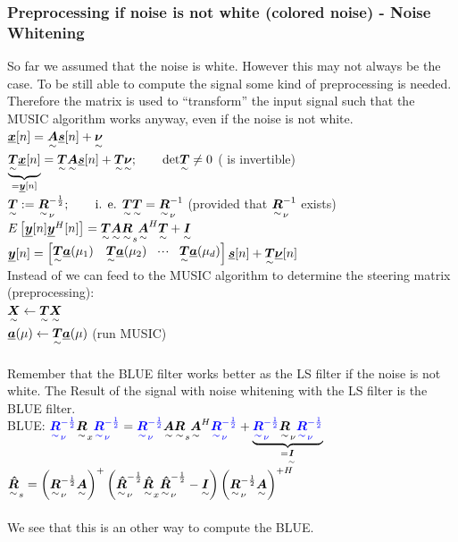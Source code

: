 \subsubsection{Preprocessing if noise is not white (colored noise) - Noise Whitening}
So far we assumed that the noise is white. However this may not always be the case. To be still able to compute the signal some kind of preprocessing is needed. Therefore the matrix  is used to ``transform'' the input signal such that the MUSIC algorithm works anyway, even if the noise is not white.\\
$\vec{x}[n]=\ma{A}\vec{s}[n]+\ma{\nu}$\\
$\underbrace{\ma{T}\vec{x}[n]}_{=\vec{y}[n]}=\ma{T}\ma{A}\vec{s}[n]+\ma{T}\ma{\nu};\qquad \text{det}\ma{T}\neq 0$ ( is invertible)\\
$\ma{T}:=\ma{R}_\nu^{-\frac{1}{2}};\qquad \text{i. e. } \ma{T}\ma{T}=\ma{R}_\nu^{-1}$ (provided that $\ma{R}_\nu^{-1}$ exists)\\
$E\left[\vec{y}[n]\vec{y}^H[n]\right]=\ma{T}\ma{A}\ma{R}_s\ma{A}^H\ma{T}+\ma{I}$\\
$\vec{y}[n]=\mat{\ma{T}\vec{a}(\mu_1)&\ma{T}\vec{a}(\mu_2)&\shdots&\ma{T}\vec{a}(\mu_d)}\vec{s}[n]+\ma{T}\vec{\nu}[n]$\\
Instead of  we can feed  to the MUSIC algorithm to determine the steering matrix (preprocessing):\\
$\ma{X}\leftarrow\ma{T}\ma{X}$\\
$\vec{a}(\mu)\leftarrow\ma{T}\vec{a}(\mu)$ (run MUSIC)\\ \\
\Ra Remember that the BLUE filter works better as the LS filter if the noise is not white. The Result of the signal with noise whitening with the LS filter is the BLUE filter. \\

BLUE: $\textcolor[rgb]{0,0,1}{\ma{R}_\nu^{-\frac{1}{2}}}\ma{R}_x\textcolor[rgb]{0,0,1}{\ma{R}_\nu^{-\frac{1}{2}}}=\textcolor[rgb]{0,0,1}{\ma{R}_\nu^{-\frac{1}{2}}}\ma{A}\ma{R}_s\ma{A}^H\textcolor[rgb]{0,0,1}{\ma{R}_\nu^{-\frac{1}{2}}}+\underbrace{\textcolor[rgb]{0,0,1}{\ma{R}_\nu^{-\frac{1}{2}}}\ma{R}_\nu\textcolor[rgb]{0,0,1}{\ma{R}_\nu^{-\frac{1}{2}}}}_{=\ma{I}}$\\
$\ma{\hat{R}}_s=\left(\ma{R}_\nu^{-\frac{1}{2}}\ma{A}\right)^+\left(\ma{\hat{R}}_\nu^{-\frac{1}{2}}\ma{\hat{R}}_x\ma{\hat{R}}_\nu^{-\frac{1}{2}}-\ma{I}\right)\left(\ma{R}_\nu^{-\frac{1}{2}}\ma{A}\right)^{+H}$\\ \\
\Ra We see that this is an other way to compute the BLUE.

